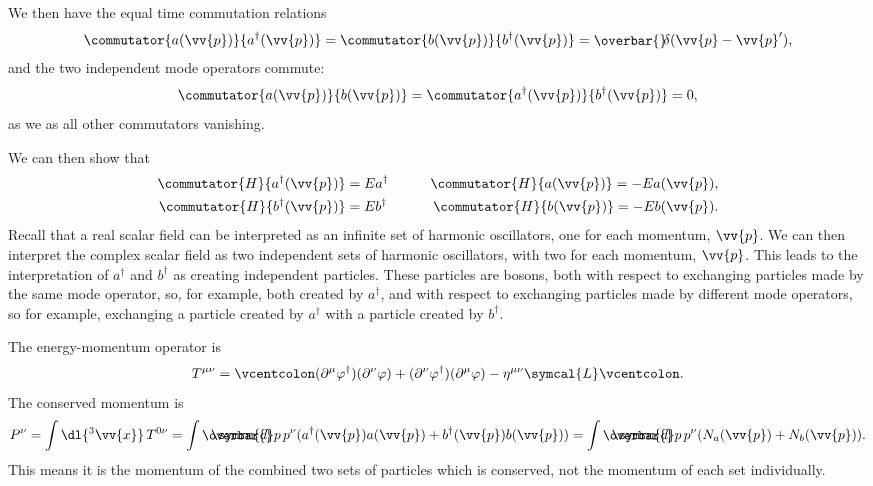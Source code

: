 \documentclass[fleqn]{NotesClass}
\newcommand{\minkowskiMetric}{\eta}
\newcommand{\lagrangianDensity}{\symcal{L}}
\newcommand{\hermit}{{\dagger}}
\newcommand\dbar{\ThisStyle{\ensurestackMath{%
            \stackengine{-.3\LMpt}{\SavedStyle \symrm{d}}{\SavedStyle\overbar{}%
                \mkern2.25mu}{O}{r}{F}{F}{L}}}}
\newcommand{\invariantmeasure}[1]{\dbar #1}
\newcommand\bardelta{\ThisStyle{\ensurestackMath{%
            \stackengine{-.3\LMpt}{\SavedStyle \delta}{\SavedStyle\overbar{}%
                \mkern4.5mu}{O}{r}{F}{F}{L}}}}
\newcommand{\normalordering}[1]{\mathopen{\vcentcolon}{#1}\mathclose{\vcentcolon}}
\begin{document}
    We then have the equal time commutation relations
    \begin{equation}
        \commutator{a(\vv{p})}{a^\hermit(\vv{p})} = \commutator{b(\vv{p})}{b^\hermit(\vv{p})} = \bardelta(\vv{p} - \vv{p}'),
    \end{equation}
    and the two independent mode operators commute:
    \begin{equation}
        \commutator{a(\vv{p})}{b(\vv{p})} = \commutator{a^\hermit(\vv{p})}{b^\hermit(\vv{p})} = 0,
    \end{equation}
    as we as all other commutators vanishing.
    
    We can then show that
    \begin{alignat}{2}
        \commutator{H}{a^\hermit(\vv{p})} &= Ea^\hermit \qquad & \commutator{H}{a(\vv{p})} = -Ea(\vv{p}),\\
        \commutator{H}{b^\hermit(\vv{p})} &= Eb^\hermit \qquad & \commutator{H}{b(\vv{p})} = -Eb(\vv{p}).
    \end{alignat}
    Recall that a real scalar field can be interpreted as an infinite set of harmonic oscillators, one for each momentum, \(\vv{p}\).
    We can then interpret the complex  scalar field as two independent sets of harmonic oscillators, with two for each momentum, \(\vv{p}\).
    This leads to the interpretation of \(a^\hermit\) and \(b^\hermit\) as creating independent particles.
    These particles are bosons, both with respect to exchanging particles made by the same mode operator, so, for example, both created by \(a^\hermit\), and with respect to exchanging particles made by different mode operators, so for example, exchanging a particle created by \(a^\hermit\) with a particle created by \(b^\hermit\).
    
    The energy-momentum operator is
    \begin{equation}
        T^{\mu\nu} = \normalordering{(\partial^\mu\varphi^\hermit)(\partial^\nu \varphi) + (\partial^\nu \varphi^\hermit) (\partial^\mu \varphi) - \minkowskiMetric^{\mu\nu}\lagrangianDensity}.
    \end{equation}
    The conserved momentum is
    \begin{equation*}
        P^\nu = \int \dl{^3\vv{x}} \, T^{0\nu} = \int \invariantmeasure{p} \, p^\nu(a^\hermit(\vv{p})a(\vv{p}) + b^\hermit(\vv{p})b(\vv{p})) = \int \invariantmeasure{p} \, p^\nu (N_a(\vv{p}) + N_b(\vv{p})).
    \end{equation*}
    This means it is the momentum of the combined two sets of particles which is conserved, not the momentum of each set individually.
    
\end{document}
